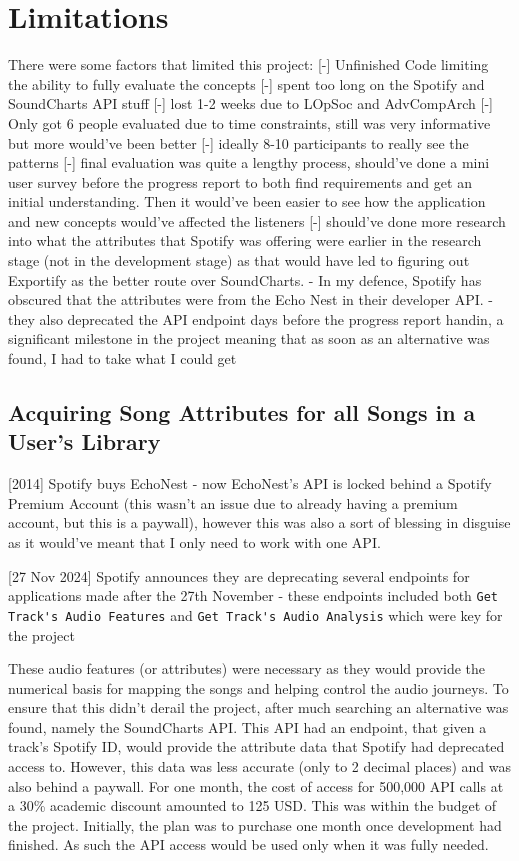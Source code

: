 \section{Limitations}
There were some factors that limited this project:
[-] Unfinished Code limiting the ability to fully evaluate the concepts
    [-] spent too long on the Spotify and SoundCharts API stuff
    [-] lost 1-2 weeks due to LOpSoc and AdvCompArch
[-] Only got 6 people evaluated due to time constraints, still was very informative but more would've been better
    [-] ideally 8-10 participants to really see the patterns
[-] final evaluation was quite a lengthy process, should've done a mini user survey before the progress report to both find requirements and get an initial understanding. Then it would've been easier to see how the application and new concepts would've affected the listeners
[-] should've done more research into what the attributes that Spotify was offering were earlier in the research stage (not in the development stage) as that would have led to figuring out Exportify as the better route over SoundCharts.
    - In my defence, Spotify has obscured that the attributes were from the Echo Nest in their developer API.
    - they also deprecated the API endpoint days before the progress report handin, a significant milestone in the project meaning that as soon as an alternative was found, I had to take what I could get

\subsection{Acquiring Song Attributes for all Songs in a User's Library}
[2014] Spotify buys EchoNest - now EchoNest's API is locked behind a Spotify Premium Account (this wasn't an issue due to already having a premium account, but this is a paywall), however this was also a sort of blessing in disguise as it would've meant that I only need to work with one API.
    
[27 Nov 2024] Spotify announces they are deprecating several endpoints for applications made after the 27th November - these endpoints included both \lstinline|Get Track's Audio Features| and \lstinline|Get Track's Audio Analysis| which were key for the project

These audio features (or attributes) were necessary as they would provide the numerical basis for mapping the songs and helping control the audio journeys.
To ensure that this didn't derail the project, after much searching an alternative was found, namely the SoundCharts API. This API had an endpoint, that given a track's Spotify ID, would provide the attribute data that Spotify had deprecated access to.
However, this data was less accurate (only to 2 decimal places) and was also behind a paywall. For one month, the cost of access for 500,000 API calls at a 30\% academic discount amounted to 125 USD. This was within the budget of the project. Initially, the plan was to purchase one month once development had finished. As such the API access would be used only when it was fully needed.

